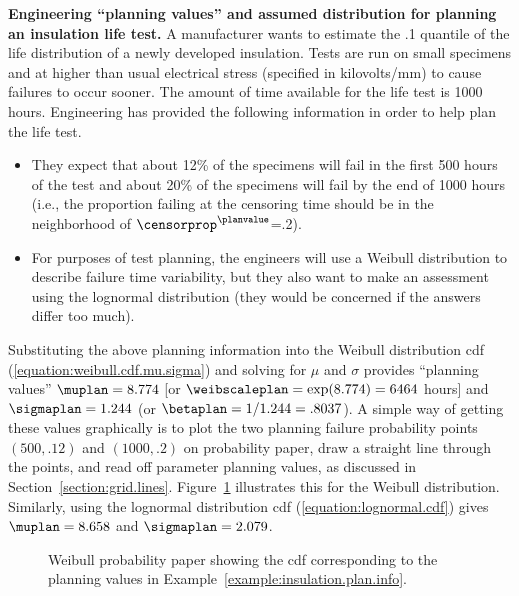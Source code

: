 \begin{example}
\label{example:insulation.plan.info}
{\bf Engineering ``planning values'' and assumed distribution for
planning an insulation life test.} A manufacturer wants
to estimate the .1 quantile of the life distribution of a newly
developed insulation.  Tests are run on small specimens and at higher
than usual electrical stress (specified in kilovolts/mm)
to cause failures to occur sooner. The amount of time available for
the life test is 1000 hours.  Engineering has provided the following
information in order to help plan the life test.
\begin{itemize}
\item
They expect that about 12\% of the specimens will fail in the first
500 hours of the test and about 20\% of the specimens will fail by
the end of 1000 hours (i.e., the proportion failing at the censoring
time should be in the neighborhood of
$\censorprop^{\planvalue}$=.2).
\item
For purposes of test planning, the engineers will use a Weibull
distribution to describe failure time variability, but they also want
to make an assessment using the lognormal distribution (they
would be concerned if the answers differ too much).
\end{itemize}
Substituting the above planning information into the Weibull
distribution cdf (\ref{equation:weibull.cdf.mu.sigma}) and solving
for $\mu$ and $\sigma$ provides ``planning values'' $\muplan=8.774$
[or $\weibscaleplan=\exp(8.774)=6464$ hours] and $\sigmaplan=1.244$ (or
$\betaplan=1/1.244=.8037$).  A simple way of getting these values
graphically is to plot the two planning failure probability points
$(500,.12)$ and $(1000,.2)$ on probability paper, draw a straight
line through the points, and read off parameter planning values, as
discussed in Section~\ref{section:grid.lines}.
Figure~\ref{figure:weibull.plan.values.ps} illustrates this for the
Weibull distribution. Similarly, using the lognormal distribution
cdf (\ref{equation:lognormal.cdf}) gives $\muplan=8.658$ and
$\sigmaplan=2.079$.
\begin{figure}
\caption{Weibull probability paper showing the cdf corresponding to
the planning values in Example~\ref{example:insulation.plan.info}.}
\label{figure:weibull.plan.values.ps}
\end{figure}
\end{example}

